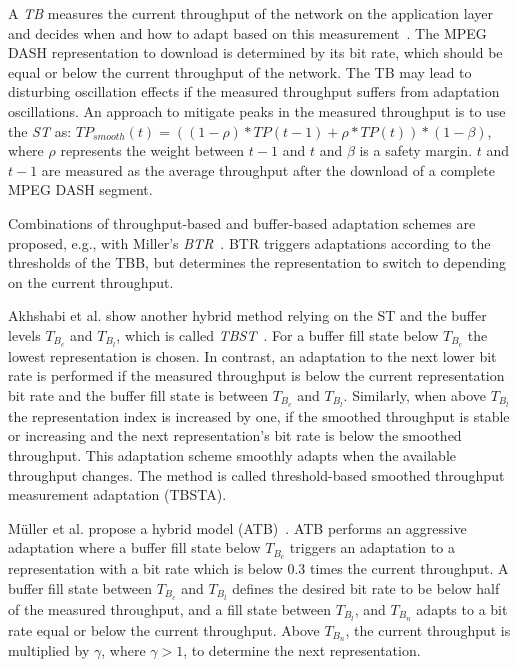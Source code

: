A \emph{\ac{TB}} measures the current throughput of the network on the application layer and decides when and how to adapt based on this measurement~\cite{Thang2012}.
The \ac{MPEG} \ac{DASH} representation to download is determined by its bit rate, which should be equal or below the current throughput of the network. 
The \ac{TB} may lead to disturbing oscillation effects if the measured throughput suffers from adaptation oscillations. 
An approach to mitigate peaks in the measured throughput is to use the \emph{\ac{ST}} as: $TP_{smooth}(t) = ((1 - \rho) * TP(t-1) +  \rho * TP(t)) * (1-\beta)$, where $\rho$ represents the weight between $t-1$ and $t$ and $\beta$ is a safety margin.
$t$ and $t-1$ are measured as the average throughput after the download of a complete \ac{MPEG} \ac{DASH} segment.

Combinations of throughput-based and buffer-based adaptation schemes are proposed, e.g., with Miller's \emph{\ac{BTR}}~\cite{Miller2012}. 
\ac{BTR} triggers adaptations according to the thresholds of the \ac{TBB}, but determines the representation to switch to depending on the current throughput.

Akhshabi et al. show another hybrid method relying on the \ac{ST} and the buffer levels $T_{B_{c}}$ and $T_{B_{l}}$, which is called \emph{\ac{TBST}}~\cite{Akhshabi2011}. 
For a buffer fill state below $T_{B_{c}}$ the lowest representation is chosen.
In contrast, an adaptation to the next lower bit rate is performed if the measured throughput is below the current representation bit rate and the buffer fill state is between $T_{B_{c}}$ and $T_{B_{l}}$.
Similarly, when above $T_{B_{l}}$ the representation index is increased by one, if the smoothed throughput is stable or increasing and the next representation's bit rate is below the smoothed throughput. 
This adaptation scheme smoothly adapts when the available throughput changes. 
The method is called threshold-based smoothed throughput measurement adaptation (TBSTA).

M\"uller et al. propose a hybrid model (\ac{ATB})~\cite{Muller2012}.
\ac{ATB} performs an aggressive adaptation where a buffer fill state below $T_{B_{c}}$ triggers an adaptation to a representation with a bit rate which is below 0.3 times the current throughput. A buffer fill state between $T_{B_{c}}$ and $T_{B_{l}}$ defines the desired bit rate to be below half of the measured throughput, and a fill state between $T_{B_{l}}$, and  $T_{B_{n}}$ adapts to a bit rate equal or below the current throughput. 
Above $T_{B_{n}}$, the current throughput is multiplied by $\gamma$, where $\gamma > 1$, to determine the next representation.

